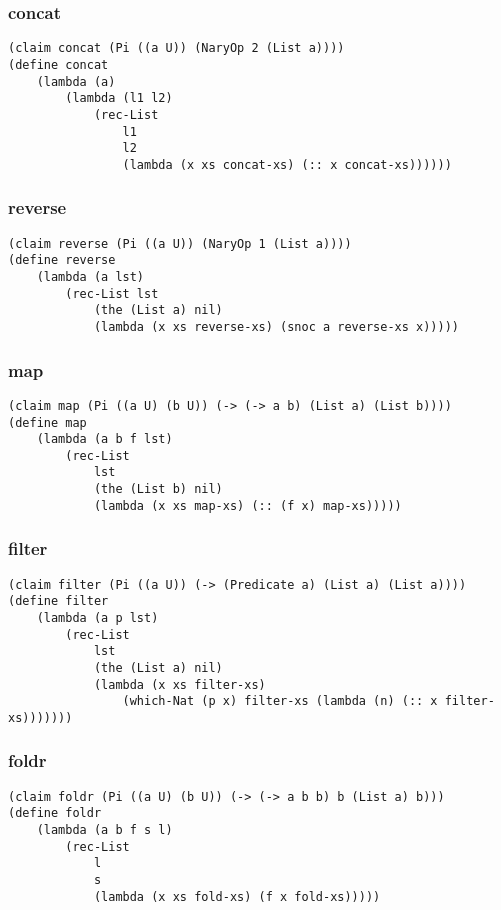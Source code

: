 \subsubsection{concat} \label{code:concat}
\begin{verbatim}
(claim concat (Pi ((a U)) (NaryOp 2 (List a))))
(define concat
    (lambda (a)
        (lambda (l1 l2)
            (rec-List
                l1
                l2
                (lambda (x xs concat-xs) (:: x concat-xs))))))
\end{verbatim}

\subsubsection{reverse} \label{code:reverse}
\begin{verbatim}
(claim reverse (Pi ((a U)) (NaryOp 1 (List a))))
(define reverse
    (lambda (a lst)
        (rec-List lst
            (the (List a) nil)
            (lambda (x xs reverse-xs) (snoc a reverse-xs x)))))
\end{verbatim}

\subsubsection{map} \label{code:map}
\begin{verbatim}
(claim map (Pi ((a U) (b U)) (-> (-> a b) (List a) (List b))))
(define map
    (lambda (a b f lst)
        (rec-List
            lst
            (the (List b) nil)
            (lambda (x xs map-xs) (:: (f x) map-xs)))))
\end{verbatim}

\subsubsection{filter} \label{code:filter}
\begin{verbatim}
(claim filter (Pi ((a U)) (-> (Predicate a) (List a) (List a))))
(define filter
    (lambda (a p lst)
        (rec-List
            lst
            (the (List a) nil)
            (lambda (x xs filter-xs)
                (which-Nat (p x) filter-xs (lambda (n) (:: x filter-xs)))))))
\end{verbatim}

\subsubsection{foldr} \label{code:foldr}
\begin{verbatim}
(claim foldr (Pi ((a U) (b U)) (-> (-> a b b) b (List a) b)))
(define foldr
    (lambda (a b f s l)
        (rec-List 
            l
            s
            (lambda (x xs fold-xs) (f x fold-xs)))))
\end{verbatim}

